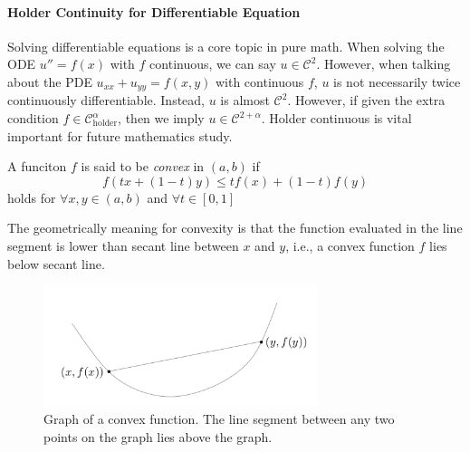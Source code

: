 \paragraph{Holder Continuity for Differentiable Equation}
Solving differentiable equations is a core topic in pure math. When solving the ODE $u''=f(x)$ with $f$ continuous, we can say $u\in\mathcal{C}^{2}$. However, when talking about the PDE $u_{xx}+u_{yy} = f(x,y)$ with continuous $f$, $u$ is not necessarily twice continuously differentiable. Instead, $u$ is almost $\mathcal{C}^2$. However, if given the extra condition $f\in\mathcal{C}_{\text{holder}}^\alpha$, then we imply $u\in\mathcal{C}^{2+\alpha}$. Holder continuous is vital important for future mathematics study.
\begin{definition}[Convex]
A funciton $f$ is said to be \emph{convex} in $(a,b)$ if 
\[
f(tx + (1-t)y) \le tf(x) + (1-t) f(y)
\]
holds for $\forall x,y\in(a,b)$ and $\forall t\in[0,1]$
\end{definition}
\begin{remark}
The geometrically meaning for convexity is that the function evaluated in the line segment is lower than secant line between $x$ and $y$, i.e., a convex function $f$ lies below secant line.
\begin{figure}[H]
\centering
\includegraphics[width=8cm]{week4/4_4.png}
\caption{Graph of a convex function. The line segment between any two points on the graph lies above the graph.}
\end{figure}
\end{remark}
